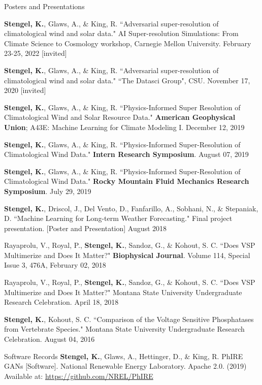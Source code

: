 \documentclass{resume} %
\begin{document}
\iftrue
\begin{rSection}{Posters and Presentations}
\setlength \itemsep{-0.4em}

\textbf{Stengel, K.}, Glaws, A., \& King, R. ``Adversarial super-resolution of climatological wind and solar data." AI Super-resolution Simulations: From Climate Science to Cosmology workshop, Carnegie Mellon University. February 23-25, 2022 [invited]

\textbf{Stengel, K.}, Glaws, A., \& King, R. ``Adversarial super-resolution of climatological wind and solar data." ``The Datasci Group", CSU. November 17, 2020 [invited]

\textbf{Stengel, K.}, Glaws, A., \& King, R. ``Physics-Informed Super Resolution of Climatological Wind and Solar Resource Data." \textbf{American Geophysical Union}; A43E: Machine Learning for Climate Modeling I. December 12, 2019

\textbf{Stengel, K.}, Glaws, A., \& King, R. ``Physics-Informed Super-Resolution of Climatological Wind Data." \textbf{Intern Research Symposium}. August 07, 2019

\textbf{Stengel, K.}, Glaws, A., \& King, R. ``Physics-Informed Super-Resolution of Climatological Wind Data." \textbf{Rocky Mountain Fluid Mechanics Research Symposium}. July 29, 2019

\textbf{Stengel, K.}, Driscol, J., Del Vento, D., Fanfarillo, A., Sobhani, N., \& Stepaniak, D. ``Machine Learning for Long-term Weather Forecasting." Final project presentation. [Poster and Presentation] August 2018

Rayaprolu, V., Royal, P., \textbf{Stengel, K.}, Sandoz, G., \& Kohout, S. C. ``Does VSP Multimerize and Does It Matter?" \textbf{Biophysical Journal}. Volume 114, Special Issue 3, 476A, February 02, 2018

Rayaprolu, V., Royal, P., \textbf{Stengel, K.}, Sandoz, G., \& Kohout, S. C. ``Does VSP Multimerize and Does It Matter?" Montana State University Undergraduate Research Celebration. April 18, 2018

\textbf{Stengel, K.}, Kohout, S. C. ``Comparison of the Voltage Sensitive Phosphatases from Vertebrate Species." Montana State University Undergraduate Research Celebration. August 04, 2016
\end{rSection}
\fi
\iftrue
\begin{rSection}{Software Records}
\textbf{Stengel, K.}, Glaws, A., Hettinger, D., \& King, R. PhIRE GANs [Software]. National Renewable Energy Laboratory. Apache 2.0. (2019) Available at: \url{https://github.com/NREL/PhIRE} %
\end{rSection}
\end{document}
